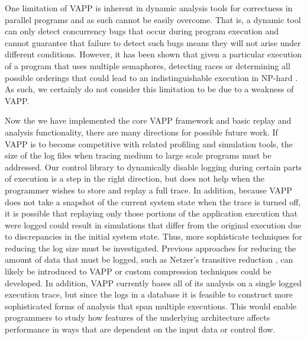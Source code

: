 One limitation of VAPP is inherent in
dynamic analysis tools for correctness in parallel programs and
as such cannot be easily overcome.  That is, a dynamic tool
can only detect concurrency bugs that occur during program
execution and cannot guarantee that failure to detect such
bugs means they will not arise under different conditions.
However, it has been shown that given a particular
execution of a program that uses multiple semaphores,
detecting races or determining all possible orderings that could
lead to an indistinguishable execution in NP-hard
\cite{netzer1990complexity}.  As such, we certainly do not consider
this limitation to be due to a weakness of VAPP.

Now the we have implemented the core VAPP framework and basic
replay and analysis functionality, there are many directions
for possible future work.  If VAPP is to become competitive
with related profiling and simulation tools, the size of the
log files when tracing medium to large scale programs must be
addressed.  Our control library to dynamically disable logging
during certain parts of execution is a step in the right direction,
but does not help when the programmer wishes to store and replay
a full trace.  In addition, because VAPP does not take a snapshot
of the current system state when the trace is turned off, it is
possible that replaying only those portions of the application
execution that were logged could result in simulations that differ
from the original execution due to discrepancies in the initial
system state.  Thus, more sophisticate techniques for reducing
the log size must be investigated.
Previous approaches for reducing the amount
of data that must be logged, such as Netzer's transitive
reduction \cite{netzer1993optimal}, can likely be introduced to
VAPP or custom compression techniques could be developed.  In addition,
VAPP currently bases all of its analysis on a single logged
execution trace, but since the logs in a database it is feasible
to construct more sophisticated forms of analysis that span multiple
executions.  This would enable programmers to study how features
of the underlying architecture affects performance in ways that
are dependent on the input data or control flow.

